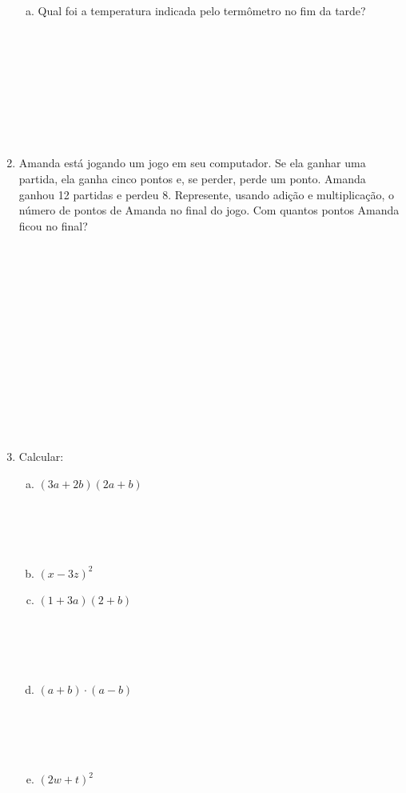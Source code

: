 \documentclass[a4paper,14pt]{article}
\begin{document}
\begin{multicols}{2}
\begin{enumerate}
\begin{enumerate}[a)]
				\item Qual foi a temperatura indicada pelo termômetro no fim da tarde? \\\\\\\\\\\\\\\\\\
			\end{enumerate}
			\item Amanda está jogando um jogo em seu computador. Se ela ganhar uma partida, ela ganha cinco pontos e, se perder, perde um ponto. Amanda ganhou 12 partidas e perdeu 8. Represente, usando adição e multiplicação, o número de pontos de Amanda no final do jogo. Com quantos pontos Amanda ficou no final? \\\\\\\\\\\\\\\\\\\\\\\\\\\\
			\item Calcular:
			\begin{enumerate}[a)]
				\item $(3a + 2b)(2a + b)$ \\\\\\\\\\
				\item $(x - 3z)^2$ \newpage
				\item $(1 + 3a)(2 + b)$ \\\\\\\\\\
				\item $(a + b) \cdot (a - b)$ \\\\\\\\\\
				\item $(2w + t)^2$ \\\\\\\\\\

\end{enumerate}
\end{enumerate}
\end{multicols}
\end{document}
